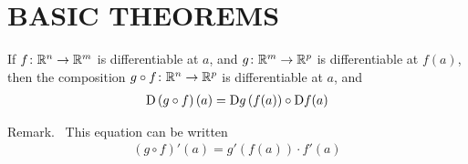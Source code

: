 \clearpage
\section[\textsc{basic theorems}]{BASIC THEOREMS}
\begin{theorem}
    If $f\colon{}\mathbb{R}^n\to \mathbb{R}^m$ is differentiable at $a$, and $g\colon{} \mathbb{R}^m\to \mathbb{R}^p$ is 
    differentiable at $f(a)$, then the composition $g\circ f\colon{}\mathbb{R}^n\to \mathbb{R}^p$ is differentiable
    at $a$, and 
    \begin{align*}
        \mathrm{D}\left(g\circ f\right)(a) = \mathrm{D}g\left(f(a)\right)\circ \mathrm{D}f(a)
    \end{align*}

    Remark.~ This equation can be written 
    \begin{align*}
        (g\circ f)'(a) = g'(f(a))\cdot f'(a)
    \end{align*}
\end{theorem}

